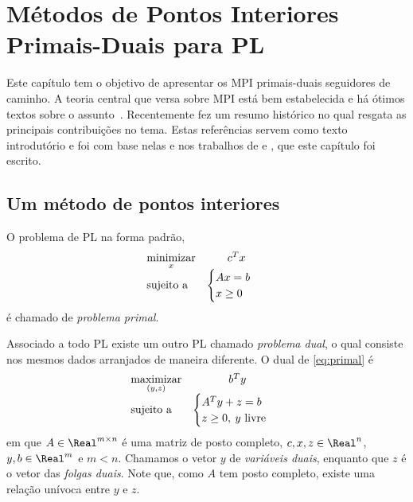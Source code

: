 

\chapter{Métodos de Pontos Interiores Primais-Duais  para \acl{PL}\label{chap:mpis}}


     

Este capítulo tem o objetivo de apresentar os \acl{MPI} primais-duais seguidores
de caminho. A teoria central que versa sobre \ac{MPI} está bem estabelecida e há
ótimos textos sobre o
assunto~\cite{Vanderbei:2008vp,Wright:Primal-dual-interior-point:1997h}.
Recentemente \citet{Gondzio:2011ta} fez um resumo histórico no qual resgata as
principais contribuições no tema.  Estas referências servem como texto
introdutório e foi com base nelas e nos trabalhos de 
 \citet{Colombo:2008wm} e \citet{Villas-Boas:2000}, que este capítulo foi
 escrito.
    

     

   
   
\section{Um método de  pontos interiores}
O  problema de \ac{PL} na forma padrão, 
\begin{equation} %
	\begin{array}{lc}
\displaystyle \minimizar_{x} & c^Tx \\
\text{sujeito a} &\begin{cases} Ax = b \\
				 x \geq 0	
				 \end{cases}\
\end{array}
\label{eq:primal}
\end{equation}
é chamado de \emph{problema primal}.

Associado a todo \ac{PL} existe um outro \ac{PL} chamado 
\emph{problema dual}, o qual consiste nos mesmos dados arranjados de maneira
diferente. O dual de \eqref{eq:primal} é
 \begin{equation}%
	\begin{array}{lc}
\displaystyle \maximizar_{(y,z)} & b^Ty \\
\text{sujeito a} &\begin{cases} A^Ty + z = b \\
				 z \geq 0, \:y \text{ livre}	
				 \end{cases}\
\end{array}
\label{eq:dual}
\end{equation}
em que $A\in \Real^{m\times n}$ é uma matriz de posto completo, $c,x,z\in
\Real^n$, $y,b\in\Real^m$ e $m<n$. Chamamos o vetor $y$ de
\emph{variáveis duais}, enquanto que  $z$ é o vetor das \emph{folgas duais}.
Note que, como $A$ tem posto completo, existe uma relação unívoca entre
$y$ e $z$. 

